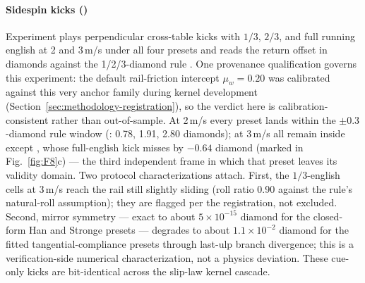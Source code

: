 \paragraph{Sidespin kicks ()}
Experiment  plays perpendicular cross-table kicks with $1/3$,
$2/3$, and full running english at 2 and 3\,m/s under all four presets and
reads the return offset in diamonds against the 1/2/3-diamond rule
\citep{alciatore_faq, alciatore_tp_catalog}. One provenance qualification
governs this experiment: the default rail-friction intercept
$\mu_w = 0.20$ was calibrated against this very anchor family during
kernel development (Section~\ref{sec:methodology-registration}), so the
verdict here is calibration-consistent rather than out-of-sample. At
2\,m/s every preset lands
within the $\pm 0.3$-diamond rule window (: 0.78,
1.91, 2.80 diamonds); at 3\,m/s all remain inside except
, whose full-english kick misses by $-0.64$ diamond
(marked in Fig.~\ref{fig:F8}c) --- the third independent frame in which
that preset leaves its validity domain. Two protocol
characterizations attach. First, the $1/3$-english cells at 3\,m/s reach
the rail still slightly sliding (roll ratio 0.90 against the rule's
natural-roll assumption); they are flagged per the registration, not
excluded. Second, mirror symmetry --- exact to about $5\times10^{-15}$
diamond for the closed-form Han and Stronge presets --- degrades to about
$1.1\times10^{-2}$ diamond for the fitted tangential-compliance presets
through last-ulp branch divergence; this is a verification-side numerical
characterization, not a physics deviation. These cue-only kicks are
bit-identical across the slip-law kernel cascade.

